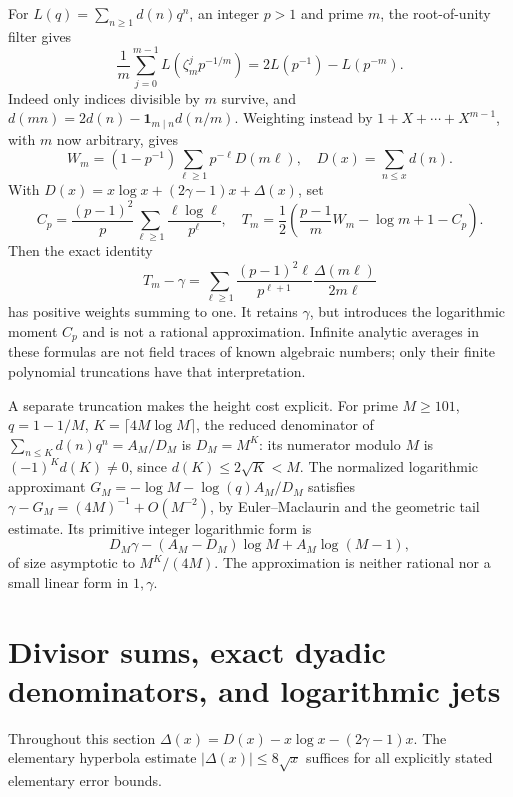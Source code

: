 \documentclass[11pt,a4paper]{article}
\theoremstyle{definition}
\theoremstyle{remark}
\numberwithin{equation}{section}
\begin{document}
For $L(q)=\sum_{n\ge1}d(n)q^n$, an integer $p>1$ and prime $m$, the
root-of-unity filter gives
\begin{equation}\label{ar:unweighted}
 \frac1m\sum_{j=0}^{m-1}L(\zeta_m^jp^{-1/m})
 =2L(p^{-1})-L(p^{-m}).
\end{equation}
Indeed only indices divisible by $m$ survive, and
$d(mn)=2d(n)-\mathbf1_{m\mid n}d(n/m)$.  Weighting instead by
$1+X+\cdots+X^{m-1}$, with $m$ now arbitrary, gives
\[
 W_m=(1-p^{-1})\sum_{\ell\ge1}p^{-\ell}D(m\ell),\quad
 D(x)=\sum_{n\le x}d(n).
\]
With $D(x)=x\log x+(2\gamma-1)x+\Delta(x)$, set
\[
 C_p=\frac{(p-1)^2}{p}\sum_{\ell\ge1}\frac{\ell\log\ell}{p^\ell},
 \quad T_m=\frac12\left(\frac{p-1}{m}W_m-\log m+1-C_p\right).
\]
Then the exact identity
\begin{equation}\label{ar:weighted}
 T_m-\gamma=\sum_{\ell\ge1}
 \frac{(p-1)^2\ell}{p^{\ell+1}}\frac{\Delta(m\ell)}{2m\ell}
\end{equation}
has positive weights summing to one.  It retains $\gamma$, but introduces
the logarithmic moment $C_p$ and is not a rational approximation.  Infinite
analytic averages in these formulas are not field traces of known algebraic
numbers; only their finite polynomial truncations have that interpretation.

A separate truncation makes the height cost explicit.  For prime $M\ge101$,
$q=1-1/M$, $K=\lceil4M\log M\rceil$, the reduced denominator of
$\sum_{n\le K}d(n)q^n=A_M/D_M$ is $D_M=M^K$: its numerator modulo $M$
is $(-1)^Kd(K)\ne0$, since $d(K)\le2\sqrt K<M$.
The normalized logarithmic approximant
$G_M=-\log M-\log(q)A_M/D_M$ satisfies
$\gamma-G_M=(4M)^{-1}+O(M^{-2})$, by Euler--Maclaurin and the geometric
tail estimate.  Its primitive integer logarithmic form is
\[
 D_M\gamma-(A_M-D_M)\log M+A_M\log(M-1),
\]
of size asymptotic to $M^K/(4M)$.  The approximation is neither rational nor
a small linear form in $1,\gamma$.

\section{Divisor sums, exact dyadic denominators, and logarithmic jets}
\label{ar:divisor}
Throughout this section $\Delta(x)=D(x)-x\log x-(2\gamma-1)x$.
The elementary hyperbola estimate $|\Delta(x)|\le8\sqrt x$ suffices for
all explicitly stated elementary error bounds.
\end{document}
